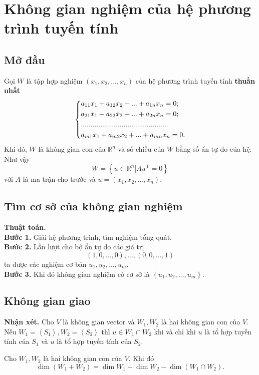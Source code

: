 \section{Không gian nghiệm của hệ phương trình tuyến tính}
\subsection{Mở đầu}
\begin{mybox}
\begin{theorem}
Gọi $W$ là tập hợp nghiệm $\left( {x_1, x_2, ..., x_n} \right)$ của hệ phương trình tuyến tính \textbf{thuần nhất}
$$\left\{ \begin{gathered}
  {a_{11}}{x_1} + {a_{12}}{x_2} + ... + {a_{1n}}{x_n} = 0; \hfill \\
  {a_{21}}{x_1} + {a_{22}}{x_2} + ... + {a_{2n}}{x_n} = 0; \hfill \\
  ............................................. \hfill \\
  {a_{m1}}{x_1} + {a_{m2}}{x_2} + ... + {a_{mn}}{x_n} = 0. \hfill \\ 
\end{gathered}  \right.$$
Khi đó, $W$ là không gian con của $\mathbb{R}^n$ và số chiều của $W$ bằng số ẩn tự do của hệ. Như vậy
$$W = \left\{ {u \in \left. {{\mathbb{R}^n}} \right|A{u^\mathrm{T}} = 0} \right\}$$
với $A$ là ma trận cho trước và $ u =\left( {x_1, x_2, ..., x_n} \right).$
\end{theorem}
\end{mybox}
\subsection{Tìm cơ sở của không gian nghiệm}
\textbf{Thuật toán.}\\
\textbf{Bước 1.} Giải hệ phương trình, tìm nghiệm tổng quát.\\
\textbf{Bước 2.} Lần lượt cho bộ ẩn tự do các giá trị
$$\left( {1,0,...,0} \right),...,\left( {0,0,...,1} \right)$$
ta được các nghiệm cơ bản $u_1, u_2, ..., u_m.$\\
\textbf{Bước 3.} Khi đó không gian nghiệm có cơ sở là $\left\{ {u_1, u_2, ..., u_m}\right\}.$
\subsection{Không gian giao}
\begin{mybox}
\textbf{Nhận xét.} Cho $V$ là không gian vector và $W_1, W_2$ là hai không gian con của $V.$ Nếu $W_1 = \left\langle {S_1} \right\rangle, W_2 = \left\langle {S_2} \right\rangle$ thì $u \in W_1 \cap W_2$ khi và chỉ khi $u$ là tổ hợp tuyến tính của $S_1$ và  $u$ là tổ hợp tuyến tính của $S_2.$
\end{mybox}
\begin{mybox}
\begin{theorem}
Cho $W_1, W_2$ là hai không gian con của $V.$ Khi đó
$$\dim \left( {{W_1} + {W_2}} \right) = \dim {W_1} + \dim {W_2} - \dim \left( {{W_1} \cap {W_2}} \right).$$
\end{theorem}
\end{mybox}
